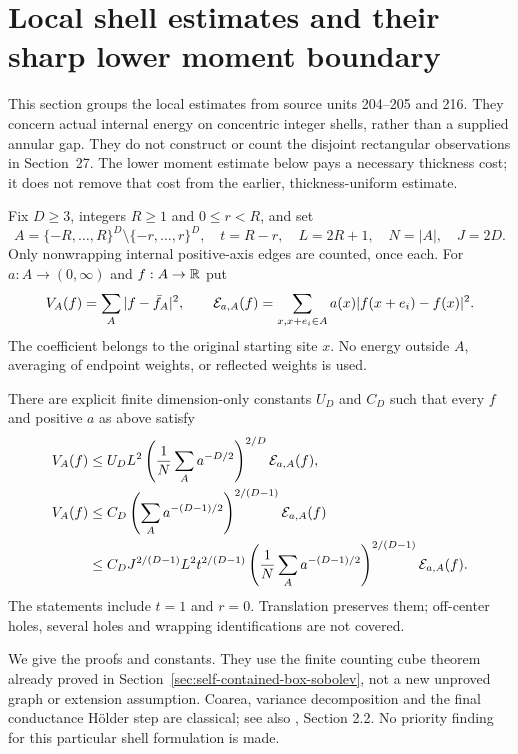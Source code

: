 \section{Local shell estimates and their sharp lower moment boundary}
\label{sec:shell217}
This section groups the local estimates from source units 204--205 and 216.
They concern actual internal energy on concentric integer shells, rather
than a supplied annular gap. They do not construct or count the disjoint
rectangular observations in Section~27. The lower moment estimate below
pays a necessary thickness cost; it does not remove that cost from the
earlier, thickness-uniform estimate.

Fix $D\geq3$, integers $R\geq1$ and $0\leq r<R$, and set
\[
 A=\{-R,\ldots,R\}^D\setminus\{-r,\ldots,r\}^D,
 \quad t=R-r,\quad L=2R+1,\quad N=|A|,\quad J=2D.
\]
Only nonwrapping internal positive-axis edges are counted, once each.
For $a:A\to(0,\infty)$ and $f:A\to\mathbb R$ put
\[
 V_A(f)=\sum_A|f-\bar f_A|^2,\qquad
 \mathcal E_{a,A}(f)=\sum_{x,x+e_i\in A}a(x)|f(x+e_i)-f(x)|^2.
\]
The coefficient belongs to the original starting site $x$. No energy
outside $A$, averaging of endpoint weights, or reflected weights is used.

\begin{theorem}\label{thm:shell217}
There are explicit finite dimension-only constants $U_D$ and $C_D$ such that
every $f$ and positive $a$ as above satisfy
\begin{align}
 V_A(f)&\leq U_D L^2
   \left(\frac1N\sum_Aa^{-D/2}\right)^{2/D}\mathcal E_{a,A}(f),
   \label{eq:shell217-full}\\
 V_A(f)&\leq C_D\left(\sum_Aa^{-(D-1)/2}\right)^{2/(D-1)}\mathcal E_{a,A}(f)
   \label{eq:shell217-intrinsic}\\
 &\leq C_D J^{2/(D-1)}L^2t^{2/(D-1)}
   \left(\frac1N\sum_Aa^{-(D-1)/2}\right)^{2/(D-1)}\mathcal E_{a,A}(f).
   \nonumber
\end{align}
The statements include $t=1$ and $r=0$. Translation preserves them;
off-center holes, several holes and wrapping identifications are not covered.
\end{theorem}

We give the proofs and constants. They use the finite counting cube theorem
already proved in Section~\ref{sec:self-contained-box-sobolev}, not a new
unproved graph or extension assumption. Coarea, variance decomposition and
the final conductance H\"older step are classical; see also \cite{ap:ads},
Section 2.2. No priority finding for this particular shell formulation is made.


